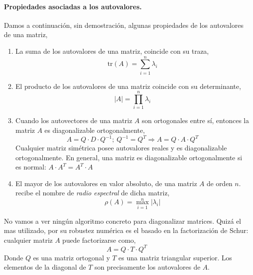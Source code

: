 \paragraph{Propiedades asociadas a los autovalores.} \label{resp} Damos a continuación, sin demostración, algunas propiedades de los autovalores de una matriz,

\begin{enumerate}
\item La suma de los autovalores de una matriz, coincide con su traza,
\begin{equation*}
\text{tr}(A)=\sum_{i=1}^n \lambda_i
\end{equation*}

\item El producto de los autovalores de una matriz coincide con su determinante,
\begin{equation*}
\left\vert A \right\vert = \prod_{i=1}^n \lambda_i
\end{equation*} 

\item Cuando los autovectores de una matriz $A$ son ortogonales entre sí, entonces la matriz $A$ es diagonalizable ortogonalmente,
\begin{equation*}
A=Q\cdot D \cdot Q^{-1}; \ Q^{-1}=Q^T \Rightarrow A=Q\cdot A \cdot Q^T
\end{equation*}
Cualquier matriz simétrica posee autovalores reales y es diagonalizable ortogonalmente. En general, una matriz es diagonalizable ortogonalmente si es normal: $A\cdot A^T=A^T\cdot A$

\item El mayor de los autovalores en valor absoluto, de una matriz $A$ de orden $n$.  recibe el nombre de \emph{radio espectral} de dicha matriz,
\begin{equation*}
\rho(A)=\max_{i=1}^n \vert \lambda_i \vert
\end{equation*} 
\end{enumerate}

No vamos a ver ningún  algoritmo concreto para diagonalizar matrices. Quizá el mas utilizado, por su robustez numérica es el basado en la factorización de Schur: cualquier matriz $A$ puede factorizarse como,
\begin{equation*}
A=Q\cdot T \cdot Q^T
\end{equation*}
Donde $Q$ es una matriz ortogonal y $T$ es una matriz triangular superior. Los elementos de la diagonal de $T$ son precisamente los autovalores de $A$.

